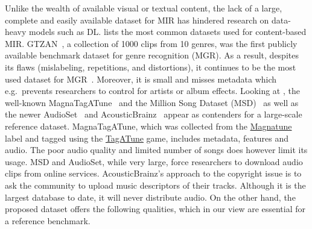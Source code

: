 \documentclass{article}
\newcommand{\todo}[1]{{\color{red} #1}}
\begin{document}
Unlike the wealth of available visual or textual content, the lack of a large, complete and easily available dataset for MIR has hindered research on data-heavy models such as DL.
 lists the most common datasets used for content-based MIR.
GTZAN~\cite{gtzan}, a collection of 1000 clips from 10 genres, was the first publicly available benchmark dataset for genre recognition (MGR). As a result, despites its flaws (mislabeling, repetitions, and distortions), it continues to be the most used dataset for MGR~\cite{mgr_eval_2}. Moreover, it is small and misses metadata which e.g.\ prevents researchers to control for artists or album effects. %
Looking at , the well-known MagnaTagATune~\cite{magnatagatune} and the Million Song Dataset (MSD)~\cite{msd} as well as the newer AudioSet~\cite{audioset} and AcousticBrainz~\cite{acousticbrainz} appear as contenders for a large-scale reference dataset.
MagnaTagATune, which was collected from the \href{https://magnatune.com/}{Magnatune} label and tagged using the \href{http://tagatune.org/}{TagATune} game, includes metadata, features and audio. The poor audio quality and limited number of songs does however limit its usage.
MSD and AudioSet, while very large, force researchers to download audio clips from online services. AcousticBrainz's approach to the copyright issue is to ask the community to upload music descriptors of their tracks. Although it is the largest database to date, it will never distribute audio.
On the other hand, the proposed dataset offers the following qualities, which in our view are essential for a reference benchmark.


\end{document}
